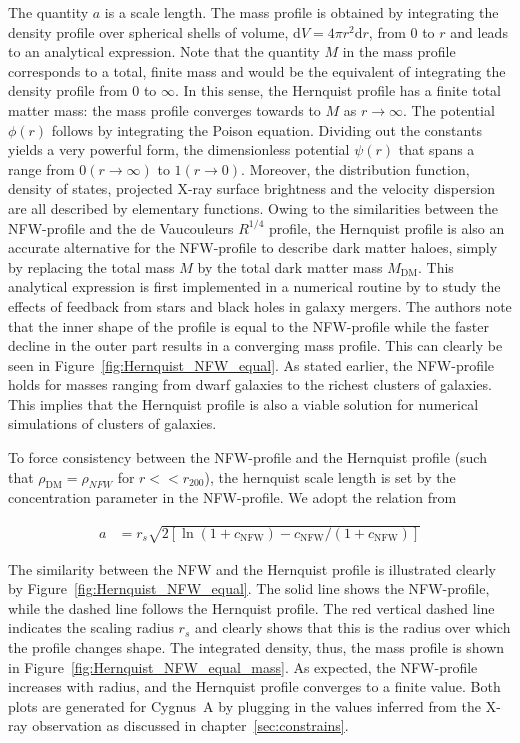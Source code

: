 \documentclass[MScProj_TLRH_ClusterEnergy.tex]{subfiles}
\begin{document}
The quantity $a$ is a scale length. The mass profile is obtained by integrating
the density profile over spherical shells of volume, $\mathrm{d}V = 4 \pi r^2 
\mathrm{d}r$, from $0$ to $r$ and leads to an analytical expression. Note that the
quantity $M$ in the mass profile corresponds to a total, finite mass and would 
be the equivalent of integrating the density profile from $0$ to $\infty$. In 
this sense, the Hernquist profile has a finite total matter mass: the mass profile 
converges towards to $M$ as $r\rightarrow \infty$. The potential $\phi(r)$ follows
by integrating the Poison equation. Dividing out the constants yields a very
powerful form, the dimensionless potential $\psi(r)$ that spans a range from 
$0 (r\rightarrow \infty)$ to $1 (r\rightarrow 0).$ Moreover, the distribution 
function, density of states, projected X-ray surface brightness and the velocity
dispersion are all described by elementary functions. Owing to the similarities
between the NFW-profile and the de Vaucouleurs $R^{1/4}$ profile, the Hernquist 
profile is also an accurate alternative for the NFW-profile to describe dark matter
haloes, simply by replacing the total mass $M$ by the total dark matter mass 
$M_{\text{DM}}$. This analytical expression is first implemented in a numerical
routine by \cite{2005MNRAS.361..776S} to study the effects of feedback from stars
and black holes in galaxy mergers. The authors note that the inner shape of the
profile is equal to the NFW-profile while the faster decline in the outer part
results in a converging mass profile. This can clearly be seen in 
Figure~\ref{fig:Hernquist_NFW_equal}. As stated earlier, the NFW-profile holds 
for masses ranging from dwarf galaxies to the richest clusters of galaxies. This 
implies that the Hernquist profile is also a viable solution for numerical 
simulations of clusters of galaxies.

To force consistency between the NFW-profile and the Hernquist profile
(such that $\rho_{\text{DM}} = \rho_{NFW}$ for $r<<r_{200}$), the hernquist 
scale length is set by the concentration parameter in the NFW-profile.
We adopt the relation from \citet{2005MNRAS.361..776S}

\begin{align}
    a &= r_s \sqrt{2 \left[\ln(1+c_{\text{NFW}}) - \right.
    \left. c_{\text{NFW}}/(1+c_{\text{NFW}}) \right]} \label{eq:a_hernquist}
\end{align}

The similarity between the NFW and the Hernquist profile is illustrated clearly 
by Figure~\ref{fig:Hernquist_NFW_equal}. The solid line shows the NFW-profile,
while the dashed line follows the Hernquist profile. The red vertical dashed
line indicates the scaling radius $r_s$ and clearly shows that this is the
radius over which the profile changes shape. The integrated density, thus, the
mass profile is shown in Figure~\ref{fig:Hernquist_NFW_equal_mass}. As 
expected, the NFW-profile increases with radius, and the Hernquist profile 
converges to a finite value. Both plots are generated for Cygnus~A by plugging 
in the values inferred from the X-ray observation as discussed in
chapter~\ref{sec:constrains}.
\end{document}
